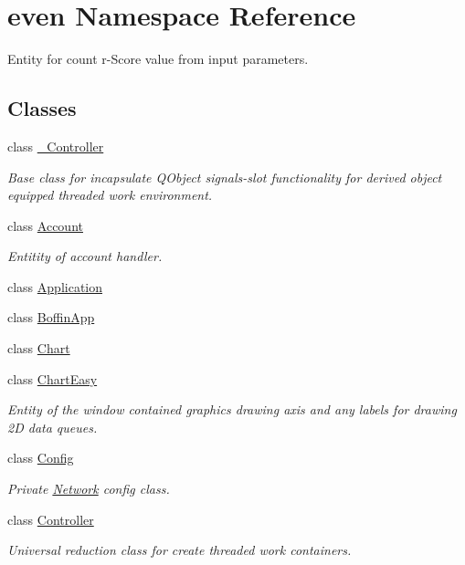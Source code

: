 \hypertarget{namespaceeven}{}\section{even Namespace Reference}
\label{namespaceeven}


Entity for count r-\/\+Score value from input parameters.  


\subsection*{Classes}
\begin{DoxyCompactItemize}
\item 
class \mbox{\hyperlink{classeven_1_1___controller}{\+\_\+\+Controller}}
\begin{DoxyCompactList}\small\item\em Base class for incapsulate Q\+Object signals-\/slot functionality for derived object equipped threaded work environment. \end{DoxyCompactList}\item 
class \mbox{\hyperlink{classeven_1_1_account}{Account}}
\begin{DoxyCompactList}\small\item\em Entitity of account handler. \end{DoxyCompactList}\item 
class \mbox{\hyperlink{classeven_1_1_application}{Application}}
\item 
class \mbox{\hyperlink{classeven_1_1_boffin_app}{Boffin\+App}}
\item 
class \mbox{\hyperlink{classeven_1_1_chart}{Chart}}
\item 
class \mbox{\hyperlink{classeven_1_1_chart_easy}{Chart\+Easy}}
\begin{DoxyCompactList}\small\item\em Entity of the window contained graphics drawing axis and any labels for drawing 2D data queues. \end{DoxyCompactList}\item 
class \mbox{\hyperlink{classeven_1_1_config}{Config}}
\begin{DoxyCompactList}\small\item\em Private \mbox{\hyperlink{classeven_1_1_network}{Network}} config class. \end{DoxyCompactList}\item 
class \mbox{\hyperlink{classeven_1_1_controller}{Controller}}
\begin{DoxyCompactList}\small\item\em Universal reduction class for create threaded work containers. \end{DoxyCompactList}\item 

\end{DoxyCompactItemize}
